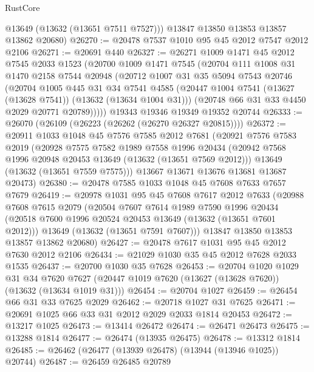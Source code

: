 \begin{lexlean}{RustCore}
\begin{coremodule}
        @13649
        (@13632 (@13651 @7511 @7527)))
      @13847
      @13850
      @13853
      @13857
      @13862
      @20680)
@26270 := @20478 @7537 @1010 @95 @45 @2012 @7547 @2012 @2106
@26271 := @20691 @440
@26327 := @26271
    @1009
    @1471
    @45
    @2012
    @7545
    @2033
    @1523
    (@20700
      @1009
      @1471
      @7545
      (@20704
        @111
        @1008
        @31
        @1470
        @2158
        @7544
        @20948
        (@20712
          @1007
          @31
          @35
          @5094
          @7543
          @20746
          (@20704
            @1005
            @445
            @31
            @34
            @7541
            @4585
            (@20447 @1004 @7541 (@13627 (@13628 @7541)) (@13632 (@13634 @1004 @31)))
            (@20748 @66 @31 @33 @4450 @2029 @20771 @20789)))))
    @19343
    @19346
    @19349
    @19352
    @20744
@26333 := @26070 (@26109 (@26223 (@26262 (@26270 @26327 @20815))))
@26372 := @20911
    @1033
    @1048
    @45
    @7576
    @7585
    @2012
    @7681
    (@20921
      @7576
      @7583
      @2019
      (@20928
        @7575
        @7582
        @1989
        @7558
        @1996
        @20434
        (@20942 @7568 @1996 @20948 @20453 @13649 (@13632 (@13651 @7569 @2012)))
        @13649
        (@13632 (@13651 @7559 @7575)))
      @13667
      @13671
      @13676
      @13681
      @13687
      @20473)
@26380 := @20478 @7585 @1033 @1048 @45 @7608 @7633 @7657 @7679
@26419 := @20978
    @1031
    @95
    @45
    @7608
    @7617
    @2012
    @7633
    (@20988
      @7608
      @7615
      @2079
      (@20504
        @7607
        @7614
        @1989
        @7590
        @1996
        @20434
        (@20518 @7600 @1996 @20524 @20453 @13649 (@13632 (@13651 @7601 @2012)))
        @13649
        (@13632 (@13651 @7591 @7607)))
      @13847
      @13850
      @13853
      @13857
      @13862
      @20680)
@26427 := @20478 @7617 @1031 @95 @45 @2012 @7630 @2012 @2106
@26434 := @21029 @1030 @35 @45 @2012 @7628 @2033 @1535
@26437 := @20700 @1030 @35 @7628
@26453 := @20704
    @1020
    @1029
    @31
    @34
    @7620
    @7627
    (@20447 @1019 @7620 (@13627 (@13628 @7620)) (@13632 (@13634 @1019 @31)))
@26454 := @20704 @1027
@26459 := @26454 @66 @31 @33 @7625 @2029
@26462 := @20718 @1027 @31 @7625
@26471 := @20691 @1025 @66 @33 @31 @2012 @2029 @2033 @1814 @20453
@26472 := @13217 @1025
@26473 := @13414 @26472
@26474 := @26471 @26473
@26475 := @13288 @1814
@26477 := @26474 (@13935 @26475)
@26478 := @13312 @1814
@26485 := @26462 (@26477 (@13939 @26478) (@13944 (@13946 @1025)) @20744)
@26487 := @26459 @26485 @20789

\end{coremodule}
\end{lexlean}
